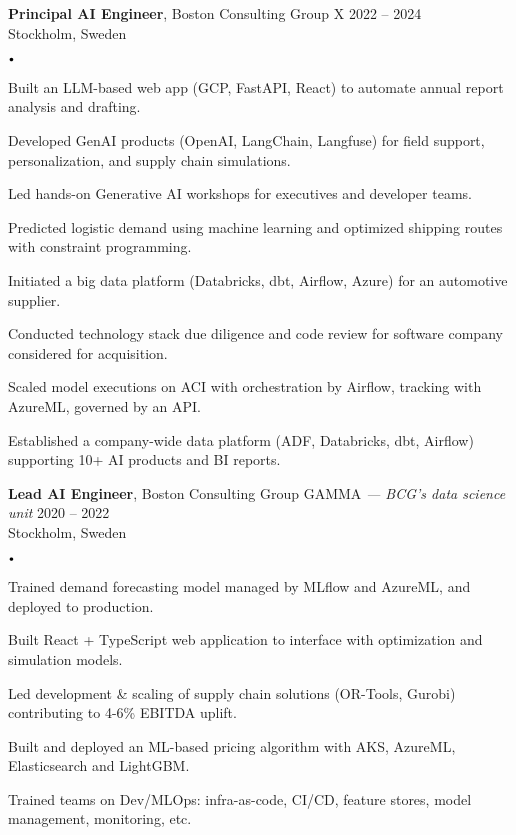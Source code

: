 \documentclass{article}
\newcommand{\experience}[5]{
    \vspace*{2pt}
    \textbf{#1}, #2 \hfill #3 \\ 
    #4 \\
    #5
    \vspace*{2pt}
}
\newcommand{\spacedbullet}{
    $\vcenter{\hbox{\tiny$\bullet$}}$\hspace*{-2pt}
}
\newenvironment{bulletlist}{
    \begin{list}
        {\spacedbullet}{\setlength\leftmargin{10pt} 
        \topsep 0pt \itemsep -2pt}}{\vspace*{4pt}
    \end{list}
}
\begin{document}
\experience{Principal AI Engineer}{Boston Consulting Group X}{2022 -- 2024}{Stockholm, Sweden}
{
    \begin{bulletlist}
        \item Built an LLM-based web app (GCP, FastAPI, React) to automate annual report analysis and drafting.
        \item Developed GenAI products (OpenAI, LangChain, Langfuse) for field support, personalization, and supply chain simulations.
        \item Led hands-on Generative AI workshops for executives and developer teams.
        \item Predicted logistic demand using machine learning and optimized shipping routes with constraint programming.
        \item Initiated a big data platform (Databricks, dbt, Airflow, Azure) for an automotive supplier.
        \item Conducted technology stack due diligence and code review for software company considered for acquisition.
        \item Scaled model executions on ACI with orchestration by Airflow, tracking with AzureML, governed by an API.
        \item Established a company-wide data platform (ADF, Databricks, dbt, Airflow) supporting 10+ AI products and BI reports.
    \end{bulletlist}
}

\experience{Lead AI Engineer}{Boston Consulting Group GAMMA \textit{— BCG's data science unit}}{2020 -- 2022}{Stockholm, Sweden}
{
    \begin{bulletlist}
        \item Trained demand forecasting model managed by MLflow and AzureML, and deployed to production.
        \item Built React + TypeScript web application to interface with optimization and simulation models.
        \item Led development \& scaling of supply chain solutions (OR-Tools, Gurobi) contributing to 4-6\% EBITDA uplift.
        \item Built and deployed an ML-based pricing algorithm with AKS, AzureML, Elasticsearch and LightGBM.
        \item Trained teams on Dev/MLOps: infra-as-code, CI/CD, feature stores, model management, monitoring, etc.
    \end{bulletlist}
}
\end{document}
